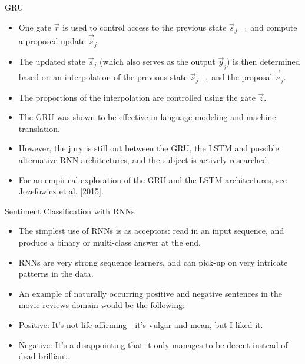 \documentclass[handout]{beamer}
\begin{document}
\begin{frame}{GRU}
\begin{scriptsize}
\begin{itemize}
\item One gate $\vec{r}$ is used to control access to the previous state $\vec{s}_{j-1}$ and compute a proposed update $\vec{\widetilde{s}}_j$.
\item The updated state $\vec{s}_j$ (which also serves as the output $\vec{y}_j$) is then determined based on an interpolation of the previous state $\vec{s}_{j-1}$ and the proposal $\vec{\widetilde{s}}_j$.
\item The proportions of the interpolation are controlled using the gate $\vec{z}$.
\item The GRU was shown to be effective in language modeling and machine translation.
\item However, the jury is still out between the GRU, the LSTM and possible alternative RNN architectures, and the subject is actively researched. 
\item For an empirical exploration of the GRU and the LSTM architectures, see Jozefowicz et al. [2015].
\end{itemize}
\end{scriptsize}
\end{frame}



\begin{frame}{Sentiment Classification with RNNs}
\begin{scriptsize}
\begin{itemize}
\item The simplest use of RNNs is as acceptors: read in an input sequence, and produce a binary or multi-class answer at the end.
\item RNNs are very strong sequence learners, and can pick-up on very
intricate patterns in the data.
\item An example of naturally occurring positive and negative sentences in the movie-reviews domain would be the following:
\item Positive: It's not life-affirming—it’s vulgar and mean, but I liked it.
\item Negative: It's a disappointing that it only manages to be decent instead of dead brilliant.
\end{itemize}
\end{scriptsize}
\end{frame}
\end{document}
